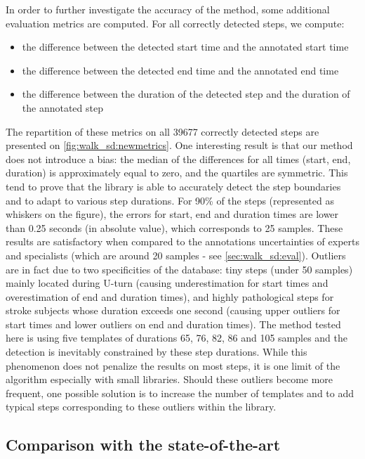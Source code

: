 \documentclass[../thesis.tex]{subfiles}
\begin{document}
In order to further investigate the accuracy of the method, some additional evaluation metrics are computed. For all correctly detected steps, we compute:
\begin{itemize}
 \item the difference between the detected start time and the annotated start time
\item the difference between the detected end time and the annotated end time
\item the difference between the duration of the detected step and the duration of the annotated step
\end{itemize}
The repartition of these metrics on all 39677 correctly detected steps are presented on \autoref{fig:walk_sd:newmetrics}. One interesting result is that our method does not introduce a bias: the median of the differences for all times (start, end, duration) is approximately equal to zero, and the quartiles are symmetric. This tend to prove that the library is able to accurately detect the step boundaries and to adapt to various step durations. For 90\% of the steps (represented as whiskers on the figure), the errors for start, end and duration times are lower than 0.25 seconds (in absolute value), which corresponds to 25 samples. These results are satisfactory when compared to the annotations uncertainties of experts and specialists (which are around 20 samples - see \autoref{sec:walk_sd:eval}). Outliers are in fact due to two specificities of the database: tiny steps (under 50 samples) mainly located during U-turn (causing underestimation for start times and overestimation of end and duration times), and highly 
pathological steps for stroke subjects whose duration exceeds one second (causing upper outliers for start times and lower outliers on end and duration times). The method tested here is using five templates of durations 65, 76, 82, 86 and 105 samples and the detection is inevitably constrained by these step durations. While this phenomenon does not penalize the results on most steps, it is one limit of the algorithm especially with small libraries. Should these outliers become more frequent, one possible solution is to increase the number of templates and to add typical steps corresponding to these outliers within the library.







\subsection{Comparison with the state-of-the-art}
\label{sub:walk_sd:state}
\end{document}
